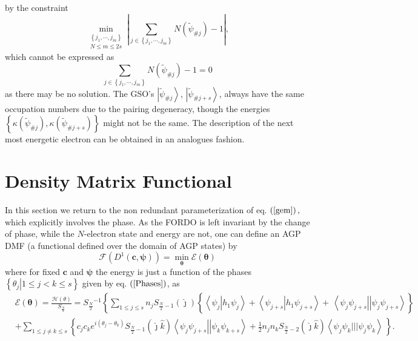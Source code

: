 \documentclass[aps,preprint]{revtex4}%
\begin{document}
by the constraint
\begin{equation}
\min_{\substack{\left\{  j_{1},\cdots,j_{m}\right\}  \\N\leq m\leq
2s}}\left\vert \sum_{j\in\left\{  j_{1},\cdots,j_{m}\right\}  }N\left(
\tilde{\psi}_{\#j}\right)  -1\right\vert ,\label{con}%
\end{equation}
which cannot be expressed as
\begin{equation}
\sum_{j\in\left\{  j_{1},\cdots,j_{m}\right\}  }N\left(  \tilde{\psi}%
_{\#j}\right)  -1=0
\end{equation}
as there may be no solution. The GSO's $\left\vert \tilde{\psi}_{\#j}%
\right\rangle $, $\left\vert \tilde{\psi}_{\#j+s}\right\rangle $, always have
the same occupation numbers due to the pairing degeneracy, though the energies
$\left\{  \kappa\left(  \tilde{\psi}_{\#j}\right)  ,\kappa\left(  \tilde{\psi
}_{\#j+s}\right)  \right\}  $ might not be the same. The description of the
next most energetic electron can be obtained in an analogues fashion.

\section{Density Matrix Functional\label{DenMatFun}}

In this section we return to the non redundant parameterization of eq.
$\left(  \ref{gem}\right)  ,$ which explicitly involves the phase. As the
FORDO is left invariant by the change of phase, while the $N$-electron state
and energy are not, one can define an AGP DMF (a functional defined over the
domain of AGP states) by%
\begin{equation}
\mathcal{F}\left(  D^{1}\left(  \boldsymbol{c},\boldsymbol{\psi}\right)
\right)  =\min_{\boldsymbol{\theta}}\mathcal{E}\left(  \boldsymbol{\theta
}\right)
\end{equation}
where for fixed $\boldsymbol{c}$ and $\boldsymbol{\psi}$ the energy is just a
function of the phases $\left\{  \left.  \theta_{j}\right\vert 1\leq j<k\leq
s\right\}  $ given by eq. $\left(  \ref{Phases}\right)  $, as
\begin{align}
&  \mathcal{E}\left(  \boldsymbol{\theta}\right)  =\frac{\mathcal{H}\left(
\theta\right)  }{S_{\frac{N}{2}}}=S_{\frac{N}{2}}{}^{-1}\left\{  \sum_{1\leq
j\leq s}n_{j}S_{\frac{N}{2}-1}\left(  \hat{\jmath}\right)  \left\{  \overset
{}{\left\langle \psi_{j}\left\vert h_{1}\psi_{j}\right.  \right\rangle
+\left\langle \psi_{j+s}\left\vert h_{1}\psi_{j+s}\right.  \right\rangle
}+\,\left\langle \psi_{j}\psi_{j+s}\right\vert \left\vert \psi_{j}\psi
_{j+s}\right\rangle \right\}  \right. \nonumber\\
&  +\sum_{1\leq j\neq k\leq s}\left\{  c_{j}c_{k}e^{i\left(  \theta_{j}%
-\theta_{k}\right)  }S_{\frac{N}{2}-1}\left(  \hat{\jmath}\hat{k}\right)
\left\langle \psi_{j}\psi_{j+s}\right\vert \left\vert \psi_{k}\psi
_{k+s}\right\rangle +\frac{1}{2}n_{j}n_{k}S_{\frac{N}{2}-2}\left(  \hat
{\jmath}\hat{k}\right)  \left\langle \psi_{j}\psi_{k}|||\psi_{j}\psi
_{k}\right\rangle \,\overset{}{}\right\}  .
\end{align}
\end{document}
